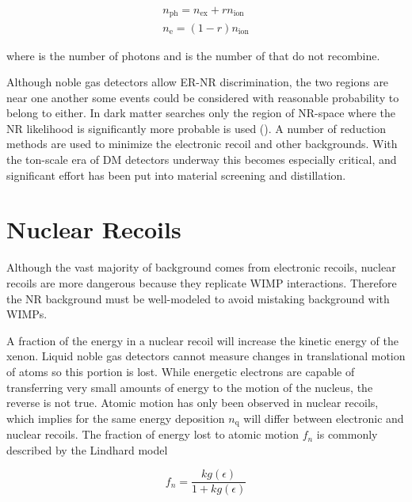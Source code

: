 \begin{subequations}
\begin{align}
n_{\mathrm{ph}} = n_{\mathrm{ex}} + rn_{\mathrm{ion}} \\
n_{\mathrm{e}} = (1 - r)n_{\mathrm{ion}}
\end{align}
\end{subequations}

\noindent where \nphot is the number of photons and \nelect is the number of \electron that do not recombine.

Although noble gas detectors allow ER-NR discrimination, the two regions are near one another some events could
be considered with reasonable probability to belong to either.  In dark matter searches only the region of NR-space where the NR
likelihood is significantly more probable is used ().  A number of reduction methods are used to minimize
the electronic recoil and other backgrounds.  With the ton-scale era of DM detectors
underway this becomes especially critical, and significant effort has been put into material screening and distillation.


\section{Nuclear Recoils}
\label{sec:nr}
Although the vast majority of background comes from electronic recoils, nuclear recoils are more dangerous because they replicate
WIMP interactions.  Therefore the NR background must be well-modeled to avoid mistaking background with WIMPs.

A fraction of the energy in a nuclear recoil will increase the kinetic energy of the xenon.  Liquid noble gas detectors cannot measure
changes in translational motion of atoms so this portion is lost.  While energetic electrons are capable of transferring very small
amounts of energy to the motion of the nucleus, the reverse is not true.  Atomic motion has only been observed in nuclear recoils,
which implies for the same energy deposition $n_{\mathrm{q}}$ will differ between electronic and nuclear recoils.  The fraction of energy
lost to atomic motion $f_{n}$ is commonly described by the Lindhard model

\begin{equation}
f_{n} = \frac{k g(\epsilon)}{1 + k g(\epsilon)}
\label{eq:linhard_quenching}
\end{equation}

